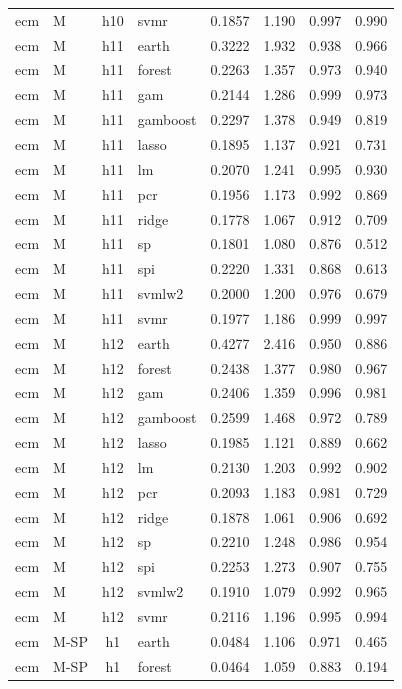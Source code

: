 \begin{ThreePartTable}
\begin{longtable}[t]{llclcccc}
ecm & M & h10 & svmr & 0.1857 & 1.190 & 0.997 & 0.990\\
\addlinespace
ecm & M & h11 & earth & 0.3222 & 1.932 & 0.938 & 0.966\\
ecm & M & h11 & forest & 0.2263 & 1.357 & 0.973 & 0.940\\
ecm & M & h11 & gam & 0.2144 & 1.286 & 0.999 & 0.973\\
ecm & M & h11 & gamboost & 0.2297 & 1.378 & 0.949 & 0.819\\
ecm & M & h11 & lasso & 0.1895 & 1.137 & 0.921 & 0.731\\
ecm & M & h11 & lm & 0.2070 & 1.241 & 0.995 & 0.930\\
ecm & M & h11 & pcr & 0.1956 & 1.173 & 0.992 & 0.869\\
ecm & M & h11 & ridge & 0.1778 & 1.067 & 0.912 & 0.709\\
ecm & M & h11 & sp & 0.1801 & 1.080 & 0.876 & 0.512\\
ecm & M & h11 & spi & 0.2220 & 1.331 & 0.868 & 0.613\\
ecm & M & h11 & svmlw2 & 0.2000 & 1.200 & 0.976 & 0.679\\
ecm & M & h11 & svmr & 0.1977 & 1.186 & 0.999 & 0.997\\
\addlinespace
ecm & M & h12 & earth & 0.4277 & 2.416 & 0.950 & 0.886\\
ecm & M & h12 & forest & 0.2438 & 1.377 & 0.980 & 0.967\\
ecm & M & h12 & gam & 0.2406 & 1.359 & 0.996 & 0.981\\
ecm & M & h12 & gamboost & 0.2599 & 1.468 & 0.972 & 0.789\\
ecm & M & h12 & lasso & 0.1985 & 1.121 & 0.889 & 0.662\\
ecm & M & h12 & lm & 0.2130 & 1.203 & 0.992 & 0.902\\
ecm & M & h12 & pcr & 0.2093 & 1.183 & 0.981 & 0.729\\
ecm & M & h12 & ridge & 0.1878 & 1.061 & 0.906 & 0.692\\
ecm & M & h12 & sp & 0.2210 & 1.248 & 0.986 & 0.954\\
ecm & M & h12 & spi & 0.2253 & 1.273 & 0.907 & 0.755\\
ecm & M & h12 & svmlw2 & 0.1910 & 1.079 & 0.992 & 0.965\\
ecm & M & h12 & svmr & 0.2116 & 1.196 & 0.995 & 0.994\\
\addlinespace
ecm & M-SP & h1 & earth & 0.0484 & 1.106 & 0.971 & 0.465\\
ecm & M-SP & h1 & forest & 0.0464 & 1.059 & 0.883 & 0.194\\

\end{longtable}
\end{ThreePartTable}
